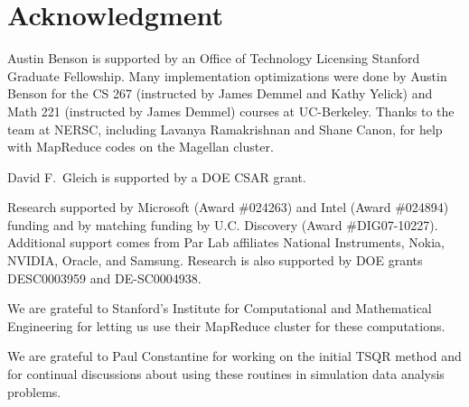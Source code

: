 \documentclass[10pt, conference, compsocconf]{IEEEtran}
\begin{document}
\section*{Acknowledgment}

Austin Benson is supported by an Office of Technology Licensing Stanford Graduate Fellowship.  Many implementation optimizations were done by Austin Benson for the CS 267 (instructed by James Demmel and Kathy Yelick) and Math 221 (instructed by James Demmel) courses at UC-Berkeley.  Thanks to the team at NERSC, including Lavanya Ramakrishnan and Shane Canon, for help with MapReduce codes on the Magellan cluster.

David F.~Gleich is supported by a DOE CSAR grant.

Research supported by Microsoft (Award \#024263) and Intel (Award \#024894) funding and by matching funding by U.C. Discovery (Award \#DIG07-10227). Additional support comes from Par Lab affiliates National Instruments, Nokia, NVIDIA, Oracle, and Samsung.  Research is also supported by DOE grants DESC0003959 and DE-SC0004938.

We are grateful to Stanford's Institute for Computational and Mathematical Engineering for letting us use their MapReduce cluster for these computations.

We are grateful to Paul Constantine for working on the initial TSQR method and for continual discussions about using these routines in simulation data analysis problems.



\end{document}
